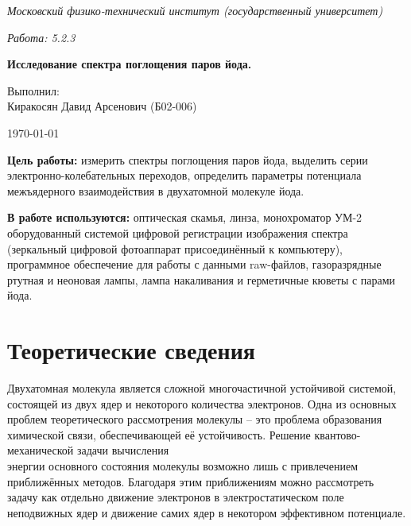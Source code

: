\documentclass[11.5pt,a4paper,russian]{article}
\begin{document}
	
\begin{titlepage}

\begin{center}

\large \textit{\small Московский физико-технический институт (государственный университет)}

\vspace{5cm}
\textit{Работа: 5.2.3}

\vspace{1cm}
\textbf{\huge Исследование спектра поглощения паров йода.}

\vspace{12cm}

\begin{flushright}
\parbox{0.45\textwidth}{
Выполнил: \\[0.5cm]
Киракосян Давид Арсенович (Б02-006) \\[0.2cm]
}
\end{flushright} 

\vfill

\today
\end{center}
\end{titlepage}

\textbf{Цель работы:} измерить спектры поглощения паров йода, выделить серии электронно-колебательных переходов, определить параметры потенциала межъядерного взаимодействия в двухатомной молекуле йода.

\textbf{В работе используются:} оптическая скамья, линза, монохроматор УМ-2 оборудованный системой цифровой регистрации изображения спектра (зеркальный цифровой фотоаппарат присоединённый к компьютеру), программное обеспечение для работы с данными raw-файлов, газоразрядные ртутная и неоновая лампы, лампа накаливания и герметичные кюветы с парами йода.

\section{Теоретические сведения}
Двухатомная молекула является сложной многочастичной устойчивой системой, состоящей из двух ядер и некоторого количества электронов. Одна из основных проблем теоретического рассмотрения молекулы – это проблема образования химической связи, обеспечивающей её устойчивость. Решение квантово-механической задачи вычисления\\
энергии основного состояния молекулы возможно лишь с привлечением приближённых методов. Благодаря этим приближениям можно рассмотреть задачу как отдельно движение электронов в электростатическом поле неподвижных ядер и движение самих ядер в некотором эффективном потенциале.
\end{document}
